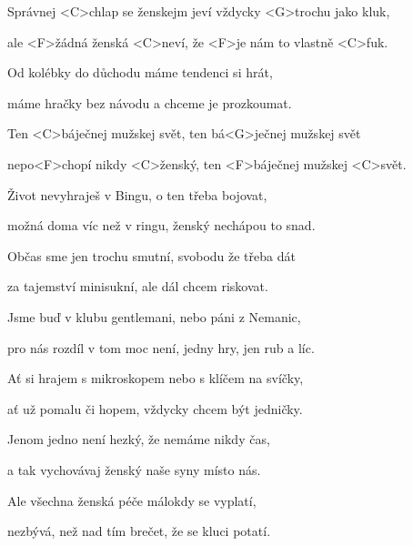 

\zs
Správnej <C>chlap se ženskejm jeví vždycky <G>trochu jako kluk,

ale <F>žádná ženská <C>neví, že <F>je nám to vlastně <C>fuk.

Od kolébky do důchodu máme tendenci si hrát,

máme hračky bez návodu a chceme je prozkoumat.
\ks

\zr
Ten <C>báječnej mužskej svět, ten bá<G>ječnej mužskej svět

nepo<F>chopí nikdy <C>ženský, ten <F>báječnej mužskej <C>svět.
\kr

\zs
Život nevyhraješ v Bingu, o ten třeba bojovat,

možná doma víc než v ringu, ženský nechápou to snad.

Občas sme jen trochu smutní, svobodu že třeba dát

za tajemství minisukní, ale dál chcem riskovat.
\ks

\zr\kr

\zs
Jsme buď v klubu gentlemani, nebo páni z Nemanic,

pro nás rozdíl v tom moc není, jedny hry, jen rub a líc.

Ať si hrajem s mikroskopem nebo s klíčem na svíčky,

ať už pomalu či hopem, vždycky chcem být jedničky.
\ks

\zr \kr

\zs
Jenom jedno není hezký, že nemáme nikdy čas,

a tak vychovávaj ženský naše syny místo nás.

Ale všechna ženská péče málokdy se vyplatí,

nezbývá, než nad tím brečet, že se kluci potatí.
\ks

\zr \kr

\kp



